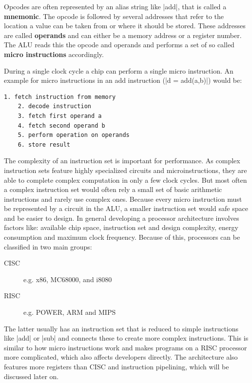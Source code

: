 Opcodes are often represented by an alias string like |add|, that is called a \textbf{mnemonic}.
The opcode is followed by several addresses that refer to the location a value can be taken from or where it should be stored.
These addresses are called \textbf{operands} and can either be a memory address or a register number.
The ALU reads this the opcode and operands and performs a set of so called \textbf{micro instructions} accordingly.

During a single clock cycle a chip can perform a single micro instruction.
An example for micro instructions in an add instruction (|d = add(a,b)|) would be:\citep[p.~23ff.]{microprocessor}
\begin{lstlisting}[caption=example of micro instructions, label=lst:microinstruction]
    1. fetch instruction from memory
    2. decode instruction
    3. fetch first operand a
    4. fetch second operand b
    5. perform operation on operands
    6. store result
\end{lstlisting}

The complexity of an instruction set is important for performance. 
As complex instruction sets feature highly specialized circuits and microinstructions, they are able to complete complex computation in only a few clock cycles.
But most often a complex instruction set would often rely a small set of basic arithmetic instructions and rarely use complex ones.
Because every micro instruction must be represented by a circuit in the \ac{ALU}, a smaller instruction set would safe space and be easier to design.
In general developing a processor architecture involves factors like: available chip space, instruction set and design complexity, energy consumption and maximum clock frequency.
Because of this, processors can be classified in two main groups:
\begin{description}
    \item[\ac{CISC}] e.g. x86, MC68000, and i8080
    \item[\ac{RISC}] e.g. \ac{POWER}, ARM and MIPS
\end{description}
The latter usually has an instruction set that is reduced to simple  instructions like |add| or |sub| and connects these to create more complex instructions.
This is similar to how micro instructions work and makes programs on a \ac{RISC} processor more complicated, which also affects developers directly.
The architecture also features more registers than \ac{CISC} and instruction pipelining, which will be discussed later on.

